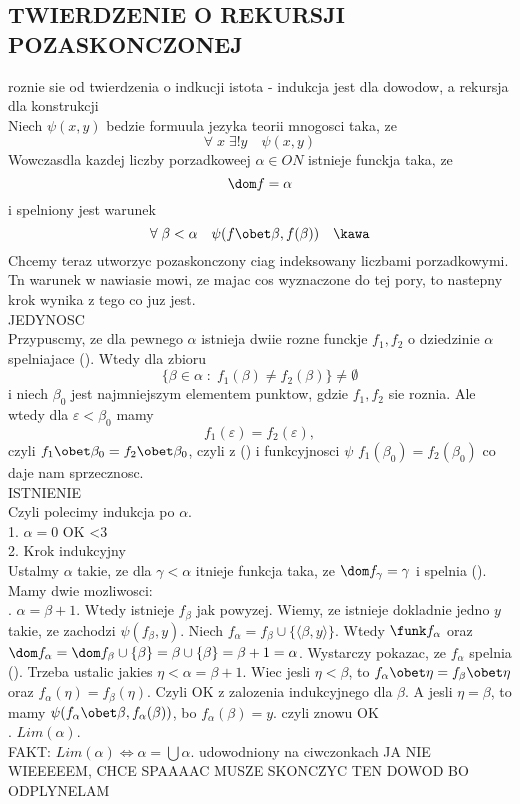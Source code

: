 \documentclass{article}
\begin{document}
\subsection*{TWIERDZENIE O REKURSJI POZASKONCZONEJ}
    roznie sie od twierdzenia o indkucji istota - indukcja jest dla dowodow, a rekursja dla konstrukcji\medskip\\
    Niech $\psi(x,y)$ bedzie formuula jezyka teorii mnogosci taka, ze
    $$\forall\;x\;\exists!y\quad\psi(x,y)$$
    Wowczasdla kazdej liczby porzadkoweej $\alpha\in ON$ istnieje funckja taka, ze
    $$\dom f = \alpha$$
    i spelniony jest warunek
    $$\forall\;\beta<\alpha\quad\psi(f\obet \beta, f(\beta))\quad{\kawa}$$
    Chcemy teraz utworzyc pozaskonczony ciag indeksowany liczbami porzadkowymi. Tn warunek w nawiasie mowi, ze majac cos wyznaczone do tej pory, to nastepny krok wynika z tego co juz jest.\bigskip\\
    \dowod
    JEDYNOSC\medskip\\
    Przypuscmy, ze dla pewnego $\alpha$ istnieja dwiie rozne funckje $f_1,f_2$ o dziedzinie $\alpha$ spelniajace (\kawa). Wtedy dla zbioru 
    $$\{\beta\in\alpha\;:\;f_1(\beta)\neq f_2(\beta)\}\neq\emptyset$$
    i niech $\beta_0$ jest najmniejszym elementem punktow, gdzie $f_1,f_2$ sie roznia. Ale wtedy dla $\varepsilon<\beta_0$ mamy
    $$f_1(\varepsilon)=f_2(\varepsilon),$$
    czyli $f_1\obet\beta_0=f_2\obet\beta_0$, czyli z (\kawa) i funkcyjnosci $\psi$ $f_1(\beta_0)=f_2(\beta_0)$ co daje nam sprzecznosc.\bigskip\\
    ISTNIENIE\medskip\\
    Czyli polecimy indukcja po $\alpha$.\smallskip\\
    1. $\alpha=0$ OK <3\smallskip\\
    2. Krok indukcyjny\\
    Ustalmy $\alpha$ takie, ze dla $\gamma<\alpha$ itnieje funkcja taka, ze $\dom f_\gamma=\gamma$ i spelnia (\kawa). Mamy dwie mozliwosci:\smallskip\\
    . $\alpha=\beta+1$. Wtedy istnieje $f_\beta$ jak powyzej. Wiemy, ze istnieje dokladnie jedno $y$ takie, ze zachodzi $\psi(f_\beta,y)$. Niech $f_\alpha=f_\beta\cup\{\langle \beta,y\rangle\}$. Wtedy $\funk f_\alpha$ oraz $\dom f_\alpha=\dom f_\beta \cup \{\beta\}=\beta\cup\{\beta\}=\beta+1=\alpha$. Wystarczy pokazac, ze $f_\alpha$ spelnia (\kawa). Trzeba ustalic jakies $\eta<\alpha=\beta+1$. Wiec jesli $\eta<\beta$, to $f_\alpha\obet\eta= f_\beta\obet \eta$ oraz $f_\alpha(\eta)=f_\beta(\eta)$. Czyli OK z zalozenia indukcyjnego dla $\beta$. A jesli $\eta=\beta$, to mamy $\psi(f_\alpha\obet\beta, f_\alpha(\beta))$, bo $f_\alpha(\beta)=y$. czyli znowu OK\medskip\\
    . $Lim(\alpha)$.\smallskip\\
        FAKT: $Lim(\alpha)\iff\alpha=\bigcup\alpha$. udowodniony na ciwczonkach JA NIE WIEEEEEM, CHCE SPAAAAC
        MUSZE SKONCZYC TEN DOWOD BO ODPLYNELAM 
\end{document}
